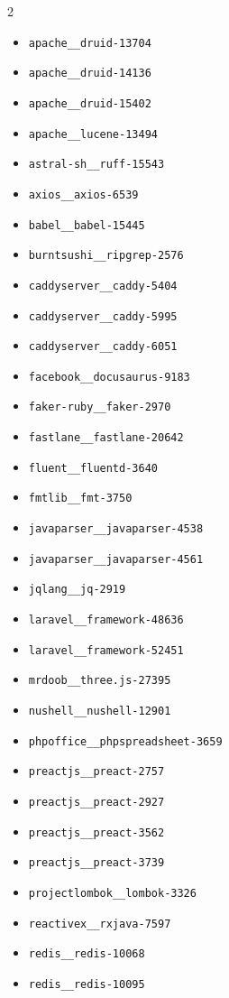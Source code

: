 \documentclass{article}
\begin{document}
\begin{multicols}{2}
\begin{itemize}
\item \texttt{apache\_\_druid-13704}
\item \texttt{apache\_\_druid-14136}
\item \texttt{apache\_\_druid-15402}
\item \texttt{apache\_\_lucene-13494}
\item \texttt{astral-sh\_\_ruff-15543}
\item \texttt{axios\_\_axios-6539}
\item \texttt{babel\_\_babel-15445}
\item \texttt{burntsushi\_\_ripgrep-2576}
\item \texttt{caddyserver\_\_caddy-5404}
\item \texttt{caddyserver\_\_caddy-5995}
\item \texttt{caddyserver\_\_caddy-6051}
\item \texttt{facebook\_\_docusaurus-9183}
\item \texttt{faker-ruby\_\_faker-2970}
\item \texttt{fastlane\_\_fastlane-20642}
\item \texttt{fluent\_\_fluentd-3640}
\item \texttt{fmtlib\_\_fmt-3750}
\item \texttt{javaparser\_\_javaparser-4538}
\item \texttt{javaparser\_\_javaparser-4561}
\item \texttt{jqlang\_\_jq-2919}
\item \texttt{laravel\_\_framework-48636}
\item \texttt{laravel\_\_framework-52451}
\item \texttt{mrdoob\_\_three.js-27395}
\item \texttt{nushell\_\_nushell-12901}
\item \texttt{phpoffice\_\_phpspreadsheet-3659}
\item \texttt{preactjs\_\_preact-2757}
\item \texttt{preactjs\_\_preact-2927}
\item \texttt{preactjs\_\_preact-3562}
\item \texttt{preactjs\_\_preact-3739}
\item \texttt{projectlombok\_\_lombok-3326}
\item \texttt{reactivex\_\_rxjava-7597}
\item \texttt{redis\_\_redis-10068}
\item \texttt{redis\_\_redis-10095}

\end{itemize}
\end{multicols}
\end{document}
